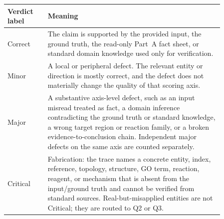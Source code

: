 \begin{appendices}
 
 
 
 
 

 
 
 
 
 
 
 
 
 
 
 
 
 
 
 
 
 
 
 
 
 
\begin{longtable}{P{0.16\linewidth}P{0.70\linewidth}}
\toprule
\textbf{Verdict label} & \textbf{Meaning} \\
\midrule
Correct & The claim is supported by the provided input, the ground truth, the read-only Part~A fact sheet, or standard domain knowledge used only for verification. \\
Minor & A local or peripheral defect. The relevant entity or direction is mostly correct, and the defect does not materially change the quality of that scoring axis. \\
Major & A substantive axis-level defect, such as an input misread treated as fact, a domain inference contradicting the ground truth or standard knowledge, a wrong target region or reaction family, or a broken evidence-to-conclusion chain. Independent major defects on the same axis are counted separately. \\
Critical & Fabrication: the trace names a concrete entity, index, reference, topology, structure, GO term, reaction, reagent, or mechanism that is absent from the input/ground truth and cannot be verified from standard sources. Real-but-misapplied entities are not Critical; they are routed to Q2 or Q3. \\
\bottomrule
\end{longtable}


\end{appendices}
